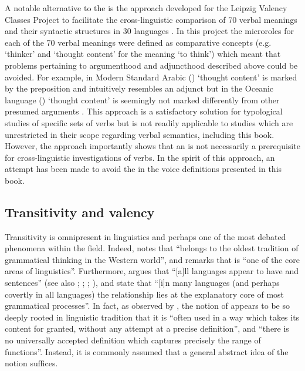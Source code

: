 A notable alternative to the  is the  approach developed for the Leipzig Valency Classes Project to facilitate the cross-linguistic comparison of 70 verbal meanings and their syntactic structures in 30 languages \citep{hartmann:al:2013, malchukov:comrie:2015a, malchukov:comrie:2015b}. In this project the microroles for each of the 70 verbal meanings were defined as comparative concepts (e.g. ‘thinker’ and ‘thought content’ for the meaning ‘to think’) which meant that problems pertaining to argumenthood and adjuncthood described above could be avoided. For example, in Modern Standard Arabic () ‘thought content’ is marked by the preposition  and intuitively resembles an adjunct \citep{kasz:2013} but in the Oceanic language  () ‘thought content’ is seemingly not marked differently from other presumed arguments \citep{moyse-faurie:2013}. This approach is a satisfactory solution for typological studies of specific sets of verbs but is not readily applicable to studies which are unrestricted in their scope regarding verbal semantics, including this book. However, the  approach importantly shows that an  is not necessarily a prerequisite for cross-linguistic investigations of verbs. In the spirit of this approach, an attempt has been made to avoid the  in the voice definitions presented in this book.

\subsection{Transitivity and valency} \label{transitivity-valency}
Transitivity is omnipresent in linguistics and perhaps one of the most debated phenomena within the field. Indeed, \cite[142]{lazard:2002} notes that  “belongs to the oldest tradition of grammatical thinking in the Western world”, and \cite[346]{kittila:2010} remarks that  is “one of the core areas of linguistics”. Furthermore, \cite[128]{dixon:1972} argues that “[a]ll languages appear to have  and  sentences” (see also \citealt[102]{dixon:1979}; \citeyear[6]{dixon:1994}; \citeyear[30]{dixon:2000}; \citealt[2]{dixon:aikhenvald:2000}), and \cite[1]{hopper:thompson:1982} state that “[i]n many languages (and perhaps covertly in all languages) the  relationship lies at the explanatory core of most grammatical processes”. In fact, as observed by \cite[2]{nass:2007}, the notion of  appears to be so deeply rooted in linguistic tradition that it is “often used in a way which takes its content for granted, without any attempt at a precise definition”, and “there is no universally accepted definition which captures precisely the range of functions”. Instead, it is commonly assumed that a general abstract idea of the notion suffices.

